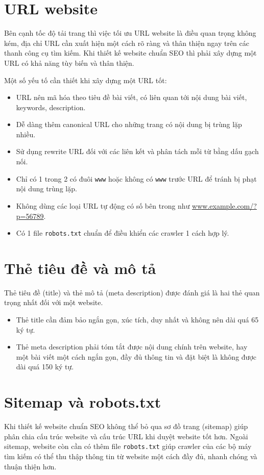 \section{URL website}
Bên cạnh tốc độ tải trang thì việc tối ưu URL website là điều quan trọng không kém, địa chỉ URL cần xuất hiện một cách rõ ràng và thân thiện ngay trên các thanh công cụ tìm kiếm. Khi thiết kế website chuẩn SEO thì phải xây dựng một URL có khả năng tùy biến và thân thiện.
\par
Một số yếu tố cần thiết khi xây dựng một URL tốt:
\begin{itemize}
	\item URL nên mã hóa theo tiêu đề bài viết, có liên quan tới nội dung bài viết, keywords, description.
	\item Dễ dàng thêm canonical URL cho những trang có nội dung bị trùng lặp nhiều.
	\item Sử dụng rewrite URL đối với các liên kết và phân tách mỗi từ bằng dấu gạch nối.
	\item Chỉ có 1 trong 2 có đuôi \texttt{www} hoặc không có \texttt{www} trước URL để tránh bị phạt nội dung trùng lặp.
	\item Không dùng các loại URL tự động có số bên trong như \url{www.example.com/?p=56789}.
	\item Có 1 file \texttt{robots.txt} chuẩn để điều khiển các crawler 1 cách hợp lý.
\end{itemize}
\section{Thẻ tiêu đề và mô tả}
Thẻ tiêu đề (title) và thẻ mô tả (meta description) được đánh giá là hai thẻ quan trọng nhất đối với một website.
\begin{itemize}
	\item Thẻ title cần đảm bảo ngắn gọn, xúc tích, duy nhất và không nên dài quá 65 ký tự.
	\item Thẻ meta description phải tóm tắt được nội dung chính trên website, hay một bài viết một cách ngắn gọn, đầy đủ thông tin và đặt biệt là không được dài quá 150 ký tự.
\end{itemize}
\section{Sitemap và robots.txt}
Khi thiết kế website chuẩn SEO không thể bỏ qua sơ đồ trang (sitemap) giúp phân chia cấu trúc website và cấu trúc URL khi duyệt website tốt hơn. Ngoài sitemap, website còn cần có thêm file \texttt{robots.txt} giúp crawler của các bộ máy tìm kiếm có thể thu thập thông tin từ website một cách đầy đủ, nhanh chóng và thuận thiện hơn.
